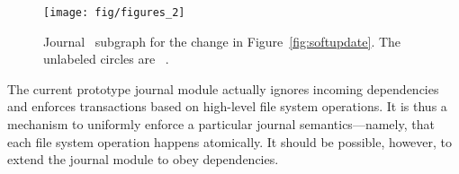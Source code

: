 \begin{comment}
Almost all of this description of journaling translates directly into \chdesc\
dependencies. The incoming \chdescs\ must be rearranged to implement the new
structure, but for the most part this transformation is straightforward. There
are two special considerations which the journal \module\ must address, however.

First, with soft updates, \chdescs\ can always be written to the disk when
flushing the cache, while the journal must be able to ``lock'' \chdescs\ into
the cache while transactions are in progress. To accomplish this, the journal
\module\ uses a managed \noop\ \chdesc, as outlined in
Section~\ref{sec:patch:noop}.

Second, the commit record is created at the end of the transaction, but the file
system changes created during the transaction must be made to depend on it.
Ordinarily this is not permitted (see \S\ref{sec:patch:nrb}). The condition for
violating this rule is a static proof that no cycle can result from doing so
(immediately or in the future); we have determined this to be the case for the
journal \module\ by hand.
\end{comment}

\begin{figure}
  \centering
  \texttt{[image: fig/figures\_2]}
  \caption{\label{fig:journal} Journal \chdesc\ subgraph for the
    change in Figure~\ref{fig:softupdate}. The unlabeled circles are
    \noop\ \chdescs.}
\end{figure}

\begin{comment}
Figure~\ref{fig:journal} shows the \chdesc\ configuration which is created
by applying the journal transformation to the \chdescs\ in
Figure~\ref{fig:softupdate}. The original four \chdescs\ have been
modified to depend on a journal commit record (via \anoop\ \chdesc), and
no longer have explicit dependencies on each other. The commit record
depends on journal blocks containing copies of the changes. Finally, the
commit record can be marked as completed once the original four \chdescs\
have been written. This transformation is performed incrementally as
\chdescs\ arrive. 
\end{comment}

\begin{comment}
Due to this design, the journal \module\ is completely independent of any
specific file system. It is a block device \module\ that automatically journals
whatever file system is stored on it. In fact, the incoming \chdescs\ need not
be arranged for soft updates, or for that matter in any particular configuration
at all.
\end{comment}


The current prototype journal module actually ignores incoming dependencies
and enforces transactions based on high-level file system operations.
%
It is thus a mechanism to uniformly enforce a particular journal
semantics---namely, that each file system operation happens atomically.
%
It should be possible, however, to extend the journal module to obey
dependencies.
